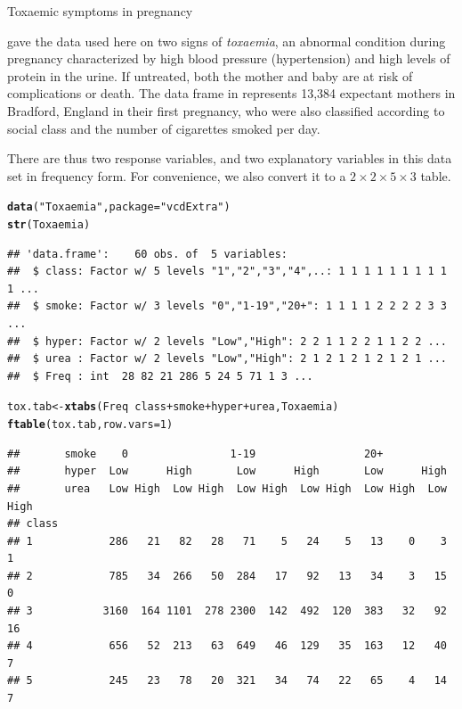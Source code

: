 \documentclass[11pt]{book}\usepackage[]{graphicx}\usepackage[]{color}
\makeatletter
\newcommand{\hlnum}[1]{\textcolor[rgb]{0.686,0.059,0.569}{#1}}%
\newcommand{\hlstr}[1]{\textcolor[rgb]{0.192,0.494,0.8}{#1}}%
\newcommand{\hlopt}[1]{\textcolor[rgb]{0,0,0}{#1}}%
\newcommand{\hlstd}[1]{\textcolor[rgb]{0.345,0.345,0.345}{#1}}%
\newcommand{\hlkwb}[1]{\textcolor[rgb]{0.69,0.353,0.396}{#1}}%
\newcommand{\hlkwc}[1]{\textcolor[rgb]{0.333,0.667,0.333}{#1}}%
\newcommand{\hlkwd}[1]{\textcolor[rgb]{0.737,0.353,0.396}{\textbf{#1}}}%
\newenvironment{kframe}{%
 \def\at@end@of@kframe{}%
 \ifinner\ifhmode%
  \def\at@end@of@kframe{\end{minipage}}%
  \begin{minipage}{\columnwidth}%
 \fi\fi%
 \def\FrameCommand##1{\hskip\@totalleftmargin \hskip-\fboxsep
 \colorbox{shadecolor}{##1}\hskip-\fboxsep
     \hskip-\linewidth \hskip-\@totalleftmargin \hskip\columnwidth}%
 \MakeFramed {\advance\hsize-\width
   \@totalleftmargin\z@ \linewidth\hsize
   \@setminipage}}%
 {\par\unskip\endMakeFramed%
 \at@end@of@kframe}
\newenvironment{knitrout}{}{} %
\renewenvironment{knitrout}{\small\renewcommand{\baselinestretch}{.85}}{} %
\makeatother
\begin{document}
\begin{Example}[toxaemia]{Toxaemic symptoms in pregnancy}

\citet{Brown-etal:83} gave the data used here on two signs of \emph{toxaemia},
an abnormal condition during pregnancy characterized by
high blood pressure (hypertension) and high levels of protein
in the urine.  If untreated, both the mother and baby are
at risk of complications or death.
The data frame  in 
represents 13,384 expectant
mothers in Bradford, England in their first pregnancy, who
were also classified according to social class and the number
of cigarettes smoked per day.

There are thus two response variables, and two explanatory variables
in this data set in frequency form.  For convenience, we also convert
it to a $2 \times 2 \times 5 \times 3$ table.
\begin{knitrout}\footnotesize
{}\color{fgcolor}\begin{kframe}
\begin{alltt}
\hlkwd{data}\hlstd{(}\hlstr{"Toxaemia"}\hlstd{,} \hlkwc{package}\hlstd{=}\hlstr{"vcdExtra"}\hlstd{)}
\hlkwd{str}\hlstd{(Toxaemia)}
\end{alltt}
\begin{verbatim}
## 'data.frame':	60 obs. of  5 variables:
##  $ class: Factor w/ 5 levels "1","2","3","4",..: 1 1 1 1 1 1 1 1 1 1 ...
##  $ smoke: Factor w/ 3 levels "0","1-19","20+": 1 1 1 1 2 2 2 2 3 3 ...
##  $ hyper: Factor w/ 2 levels "Low","High": 2 2 1 1 2 2 1 1 2 2 ...
##  $ urea : Factor w/ 2 levels "Low","High": 2 1 2 1 2 1 2 1 2 1 ...
##  $ Freq : int  28 82 21 286 5 24 5 71 1 3 ...
\end{verbatim}
\begin{alltt}
\hlstd{tox.tab} \hlkwb{<-} \hlkwd{xtabs}\hlstd{(Freq}\hlopt{~}\hlstd{class} \hlopt{+} \hlstd{smoke} \hlopt{+} \hlstd{hyper} \hlopt{+} \hlstd{urea, Toxaemia)}
\hlkwd{ftable}\hlstd{(tox.tab,} \hlkwc{row.vars}\hlstd{=}\hlnum{1}\hlstd{)}
\end{alltt}
\begin{verbatim}
##       smoke    0                1-19                 20+               
##       hyper  Low      High       Low      High       Low      High     
##       urea   Low High  Low High  Low High  Low High  Low High  Low High
## class                                                                  
## 1            286   21   82   28   71    5   24    5   13    0    3    1
## 2            785   34  266   50  284   17   92   13   34    3   15    0
## 3           3160  164 1101  278 2300  142  492  120  383   32   92   16
## 4            656   52  213   63  649   46  129   35  163   12   40    7
## 5            245   23   78   20  321   34   74   22   65    4   14    7
\end{verbatim}
\end{kframe}
\end{knitrout}


\end{Example}
\end{document}
